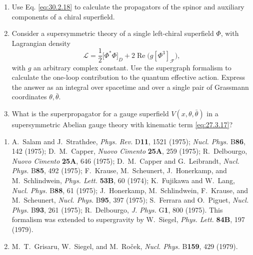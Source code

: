 

\begin{enumerate}
  \item Use Eq. \eqref{eq:30.2.18} to calculate the propagators of the
  spinor and auxiliary components of a chiral superfield.

  \item Consider a supersymmetric theory of a single left-chiral
  superfield $\Phi$, with Lagrangian density
  \[
    \mathcal{L}
    = \frac{1}{2}\bigl[\Phi^*\Phi\bigr]_D
      +2\operatorname{Re}\bigl(g[\Phi^3]_{\mathcal{F}}\bigr),
  \]
  with $g$ an arbitrary complex constant. Use the supergraph formalism
  to calculate the one-loop contribution to the quantum effective
  action. Express the answer as an integral over spacetime and over a
  single pair of Grassmann coordinates \(\theta,\bar\theta\).

  \item What is the superpropagator for a gauge superfield
  \(V(x,\theta,\bar\theta)\)
  in a supersymmetric Abelian gauge theory with kinematic term
  \eqref{eq:27.3.17}?
\end{enumerate}


\begin{enumerate}
  \item {}\label{ch30-ref-1}
  A.~Salam and J.~Strathdee, \textit{Phys. Rev.} D\textbf{11}, 1521
  (1975); \textit{Nucl. Phys.} B\textbf{86}, 142 (1975); D.~M.~Capper,
  \textit{Nuovo Cimento} \textbf{25A}, 259 (1975); R.~Delbourgo,
  \textit{Nuovo Cimento} \textbf{25A}, 646 (1975); D.~M.~Capper and
  G.~Leibrandt, \textit{Nucl. Phys.} B\textbf{85}, 492 (1975);
  F.~Krause, M.~Scheunert, J.~Honerkamp, and M.~Schlindwein,
  \textit{Phys. Lett.} \textbf{53B}, 60 (1974); K.~Fujikawa and
  W.~Lang, \textit{Nucl. Phys.} B\textbf{88}, 61 (1975); J.~Honerkamp,
  M.~Schlindwein, F.~Krause, and M.~Scheunert, \textit{Nucl. Phys.}
  B\textbf{95}, 397 (1975); S.~Ferrara and O.~Piguet,
  \textit{Nucl. Phys.} B\textbf{93}, 261 (1975); R.~Delbourgo,
  \textit{J. Phys.} G\textbf{1}, 800 (1975). This formalism was
  extended to supergravity by W.~Siegel, \textit{Phys. Lett.}
  \textbf{84B}, 197 (1979).

  \item {}\label{ch30-ref-2}
  M.~T.~Grisaru, W.~Siegel, and M.~Ro\v{c}ek,
  \textit{Nucl. Phys.} B\textbf{159}, 429 (1979).
\end{enumerate}
